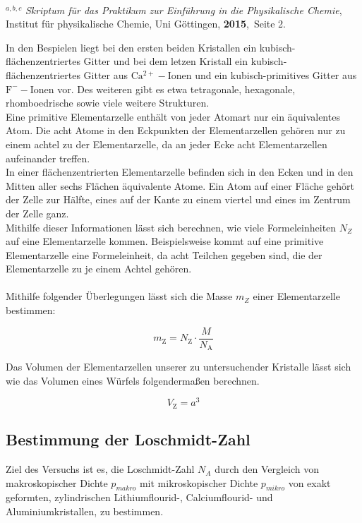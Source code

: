 \documentclass[12pt,a4paper,titlepage,headinclude,bibtotoc]{scrartcl}
\begin{document}
\hrulefill\\
$^{a,b,c}$ \emph{Skriptum für das Praktikum zur Einführung in die Physikalische Chemie}, Institut für physikalische Chemie, Uni Göttingen, \textbf{2015},\, Seite 2.

\vspace{10cm}
In den Bespielen liegt bei den ersten beiden Kristallen ein kubisch-flächenzentriertes Gitter und bei dem letzen Kristall ein kubisch-flächenzentriertes Gitter aus $\mathrm {Ca^{2+}-Ionen}$ und ein kubisch-primitives Gitter aus $ \mathrm {F^{-}-Ionen}$ vor. Des weiteren gibt es etwa tetragonale, hexagonale, rhomboedrische sowie viele weitere Strukturen.\\ Eine primitive Elementarzelle enthält von jeder Atomart nur ein äquivalentes Atom. Die acht Atome in den Eckpunkten der Elementarzellen gehören nur zu einem achtel zu der Elementarzelle, da an jeder Ecke acht Elementarzellen aufeinander treffen.\\
In einer flächenzentrierten Elementarzelle befinden sich in den Ecken und in den Mitten aller sechs Flächen äquivalente Atome. Ein Atom auf einer Fläche gehört der Zelle zur Hälfte, eines auf der Kante zu einem viertel und eines im Zentrum der Zelle ganz.\\
Mithilfe dieser Informationen lässt sich berechnen, wie viele Formeleinheiten $N_{Z}$ auf eine Elementarzelle kommen. Beispielsweise kommt auf eine primitive Elementarzelle eine Formeleinheit, da acht Teilchen gegeben sind, die der Elementarzelle zu je einem Achtel gehören.\\\\ Mithilfe folgender Überlegungen lässt sich die Masse $m_{Z}$ einer Elementarzelle bestimmen:

\begin{equation}
m_\mathrm{Z}=N_\mathrm{Z} \cdot \dfrac{M}{N_\mathrm{A}}
\end{equation} 

Das Volumen der Elementarzellen unserer zu untersuchender Kristalle lässt sich wie das Volumen eines Würfels folgendermaßen berechnen.

\begin{equation}
V_\mathrm{Z} = a^3
\end{equation}


\subsection{Bestimmung der Loschmidt-Zahl}
 
Ziel des Versuchs ist es, die Loschmidt-Zahl $N_{A}$ durch den Vergleich von makroskopischer Dichte $p_{makro}$ mit mikroskopischer Dichte $p_{mikro}$ von exakt geformten, zylindrischen Lithiumflourid-, Calciumflourid- und Aluminiumkristallen, zu bestimmen.\\\\
\end{document}
